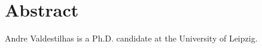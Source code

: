 \section{Abstract}
Andre Valdestilhas is a Ph.D. candidate at the University of Leipzig. 












